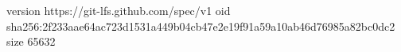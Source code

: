 version https://git-lfs.github.com/spec/v1
oid sha256:2f233aae64ac723d1531a449b04cb47e2e19f91a59a10ab46d76985a82bc0dc2
size 65632
